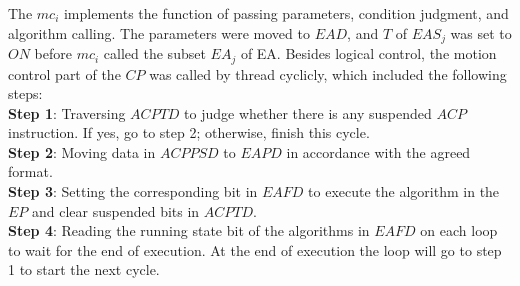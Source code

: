 \documentclass[journal]{IEEEtran}
\begin{document}
The $mc_i$ implements the function of passing parameters, condition judgment, and algorithm calling. The parameters were moved to $EAD$, and $T$ of $EAS_j$ was set to $ON$ before $mc_i$ called the subset $EA_j$ of EA.
Besides logical control, the motion control part of the $CP$ was called by thread cyclicly, which included the following steps:\\
\textbf{Step 1}: Traversing $ACPTD$ to judge whether there is any suspended $ACP$ instruction. If yes, go to step 2; otherwise, finish this cycle.\\
\textbf{Step 2}: Moving data in $ACPPSD$ to $EAPD$ in accordance with the agreed format.\\
\textbf{Step 3}: Setting the corresponding bit in $EAFD$ to execute the algorithm in the $EP$ and clear suspended bits in $ACPTD$.\\
\textbf{Step 4}: Reading the running state bit of the algorithms in $EAFD$ on each loop to wait for the end of execution. At the end of execution the loop will go to step 1 to start the next cycle.\\
\end{document}
